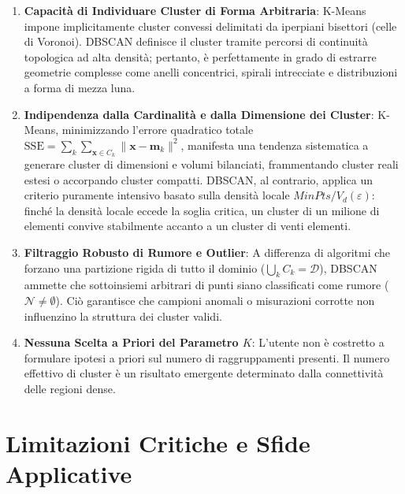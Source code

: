 \begin{enumerate}
    \item \textbf{Capacità di Individuare Cluster di Forma Arbitraria}:
    K-Means impone implicitamente cluster convessi delimitati da iperpiani bisettori (celle di Voronoi). DBSCAN definisce il cluster tramite percorsi di continuità topologica ad alta densità; pertanto, è perfettamente in grado di estrarre geometrie complesse come anelli concentrici, spirali intrecciate e distribuzioni a forma di mezza luna.
    
    \item \textbf{Indipendenza dalla Cardinalità e dalla Dimensione dei Cluster}:
    K-Means, minimizzando l'errore quadratico totale $\mathrm{SSE} = \sum_k \sum_{\mathbf{x} \in C_k} \|\mathbf{x} - \mathbf{m}_k\|^2$, manifesta una tendenza sistematica a generare cluster di dimensioni e volumi bilanciati, frammentando cluster reali estesi o accorpando cluster compatti. DBSCAN, al contrario, applica un criterio puramente intensivo basato sulla densità locale $MinPts / V_d(\varepsilon)$: finché la densità locale eccede la soglia critica, un cluster di un milione di elementi convive stabilmente accanto a un cluster di venti elementi.

    \item \textbf{Filtraggio Robusto di Rumore e Outlier}:
    A differenza di algoritmi che forzano una partizione rigida di tutto il dominio ($\bigcup_k C_k = \mathcal{D}$), DBSCAN ammette che sottoinsiemi arbitrari di punti siano classificati come rumore ($\mathcal{N} \ne \emptyset$). Ciò garantisce che campioni anomali o misurazioni corrotte non influenzino la struttura dei cluster validi.

    \item \textbf{Nessuna Scelta a Priori del Parametro $K$}:
    L'utente non è costretto a formulare ipotesi a priori sul numero di raggruppamenti presenti. Il numero effettivo di cluster è un risultato emergente determinato dalla connettività delle regioni dense.
\end{enumerate}

\FloatBarrier
\section{Limitazioni Critiche e Sfide Applicative}
\label{sec:dm-dbscan-limitations}

